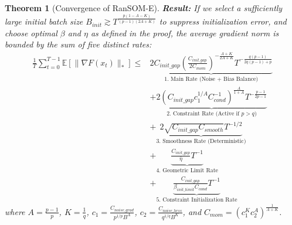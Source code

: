 \documentclass{article}
\theoremstyle{plain}
\newtheorem{theorem}{Theorem}[section]
\theoremstyle{definition}
\theoremstyle{remark}
\begin{document}
\begin{theorem}[Convergence of RanSOM-E]
\textbf{Result:}
If we select a sufficiently large initial batch size $B_{init} \gtrsim T^{\frac{p(1 - A - K)}{(p-1)(2A+K)}}$ to suppress initialization error, and choose optimal $\beta$ and $\eta$ as defined in the proof, the average gradient norm is bounded by the sum of five distinct rates:
\begin{align}
\label{eq:final_exact_rates}
    \frac{1}{T} \sum_{t=0}^{T-1} \mathbb{E}[\|\nabla F(x_t)\|_*] \le & \underbrace{2 C_{init\_gap} \left( \frac{C_{init\_gap}}{2 C_{mom}} \right)^{-\frac{A+K}{2A+K}} T^{-\frac{q(p-1)}{2q(p-1)+p}}}_{\text{1. Main Rate (Noise + Bias Balance)}} \nonumber \\
    & + \underbrace{2 \left( C_{init\_gap} c_1^{1/A} C_{cond}^{-1} \right)^{\frac{A}{1+A}} T^{-\frac{p-1}{2p-1}}}_{\text{2. Constraint Rate (Active if } p > q)} \nonumber \\
    & + \underbrace{2 \sqrt{C_{init\_gap} C_{smooth}} T^{-1/2}}_{\text{3. Smoothness Rate (Deterministic)}} \nonumber \\
    & + \underbrace{\frac{C_{init\_gap}}{\bar{\eta}} T^{-1}}_{\text{4. Geometric Limit Rate}} \nonumber \\
    & + \underbrace{\frac{C_{init\_gap}}{\beta_{init\_limit} C_{cond}} T^{-1}}_{\text{5. Constraint Initialization Rate}}
\end{align}
where $A = \frac{p-1}{p}$, $K = \frac{1}{q}$, $c_1 = \frac{C_{noise\_grad}}{p^{1/p} B^A}$, $c_2 = \frac{C_{noise\_hess}}{q^{1/q} B^K}$, and $C_{mom} = (c_1^K c_2^A)^{\frac{1}{A+K}}$.
\end{theorem}
\end{document}
